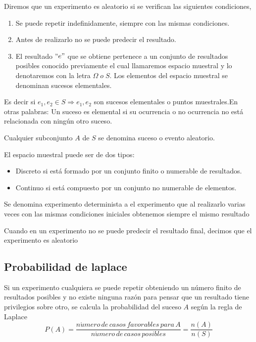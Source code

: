 \documentclass{article}%
\begin{document}
\begin{definition}
Diremos que un experimento es aleatorio si se veri\-fican las siguientes
condiciones,
\begin{enumerate}
\item Se puede repetir indefinidamente, siempre con las mismas condiciones.
\item Antes de realizarlo no se puede predecir el resultado.  \item El
resultado ''$e"$ que se obtiene pertenece a un conjunto de resultados posibles
conocido previamente el cual llamaremos espacio muestral y lo denotaremos con
la letra $\Omega\;o\;S$. Los elementos del espacio muestral se denominan
sucesos elementales.
\end{enumerate}
\end{definition} 

Es decir si $e_{1},e_{2}\in S\Longrightarrow e_{1},e_{2}$ son sucesos
elementales o puntos muestrales.En otras palabras: Un suceso es elemental si
su ocu\-rrencia o no ocurrencia no est\'{a} relacionada con ning\'{u}n otro suceso.

Cualquier subconjunto $A$ de $S$ se denomina suceso o evento aleatorio.

El espacio muestral puede ser de dos tipos:

\begin{itemize}
\item Discreto si est\'{a} formado por un conjunto finito o numerable de resultados.

\item Continuo si est\'{a} compuesto por un conjunto no numerable de elementos.
\end{itemize}%

\begin{definition}
Se denomina experimento determinista a el experimento que
al realizarlo varias veces con las mismas condiciones iniciales obtenemos
siempre el mismo resultado
\end{definition} 

Cuando en un experimento no se puede predecir el resultado final, decimos que
el experimento es aleatorio

\subsection{Probabilidad de laplace}

Si un experimento cualquiera se puede repetir obteniendo un n\'{u}mero finito
de resultados posibles y no existe ninguna raz\'{o}n para pensar que un
resultado tiene privilegios sobre otro, se calcula la probabi\-lidad del
suceso $A$ seg\'{u}n la regla de Laplace
\[
P\left(  A\right)  =\frac{n\acute{u}mero\,de\,casos\,favorables\,para\,A}%
{n\acute{u}mero\,de\,casos\,posibles}=\frac{n\left(  A\right)  }{n\left(
S\right)  }%
\]%
\end{document}
